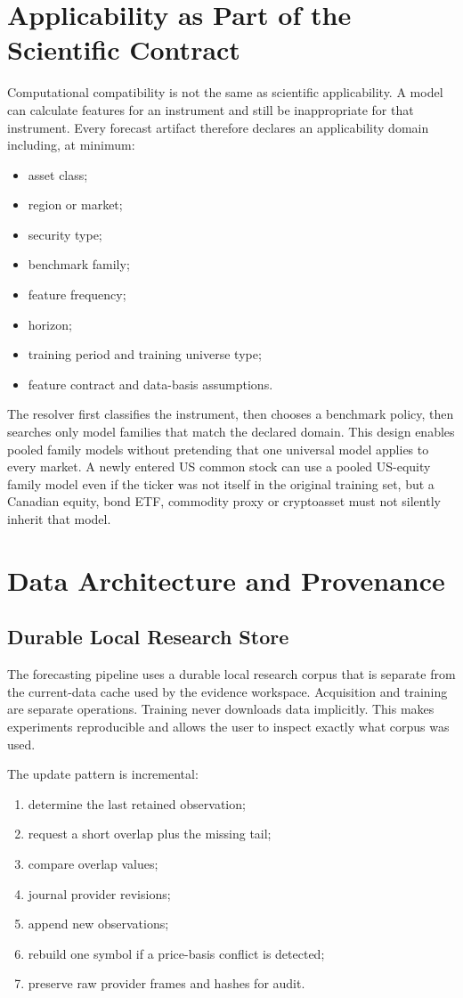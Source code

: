 \documentclass[11pt]{article}
\begin{document}
\section{Applicability as Part of the Scientific Contract}
Computational compatibility is not the same as scientific applicability. A model can calculate features for an instrument and still be inappropriate for that instrument. Every forecast artifact therefore declares an applicability domain including, at minimum:
\begin{itemize}[itemsep=0.2em]
\item asset class;
\item region or market;
\item security type;
\item benchmark family;
\item feature frequency;
\item horizon;
\item training period and training universe type;
\item feature contract and data-basis assumptions.
\end{itemize}

The resolver first classifies the instrument, then chooses a benchmark policy, then searches only model families that match the declared domain. This design enables pooled family models without pretending that one universal model applies to every market. A newly entered US common stock can use a pooled US-equity family model even if the ticker was not itself in the original training set, but a Canadian equity, bond ETF, commodity proxy or cryptoasset must not silently inherit that model.

\section{Data Architecture and Provenance}
\subsection{Durable Local Research Store}
The forecasting pipeline uses a durable local research corpus that is separate from the current-data cache used by the evidence workspace. Acquisition and training are separate operations. Training never downloads data implicitly. This makes experiments reproducible and allows the user to inspect exactly what corpus was used.

The update pattern is incremental:
\begin{enumerate}[itemsep=0.2em]
\item determine the last retained observation;
\item request a short overlap plus the missing tail;
\item compare overlap values;
\item journal provider revisions;
\item append new observations;
\item rebuild one symbol if a price-basis conflict is detected;
\item preserve raw provider frames and hashes for audit.
\end{enumerate}
\end{document}
